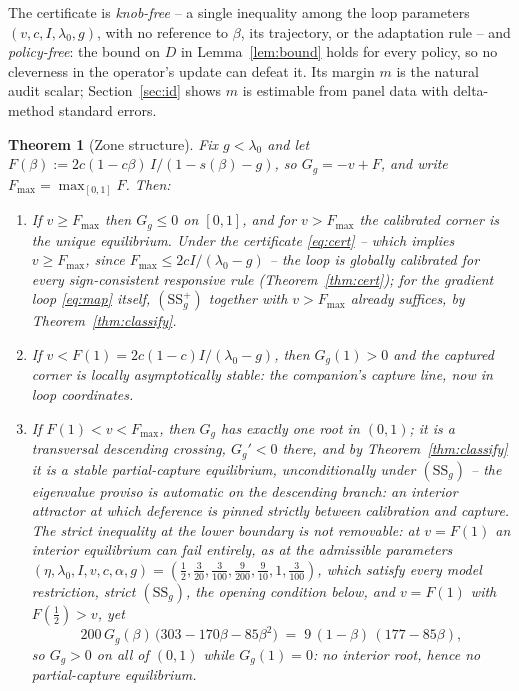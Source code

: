 \documentclass[11pt]{article}
\newtheorem{theorem}{Theorem}[section]
\theoremstyle{definition}
\theoremstyle{remark}
\numberwithin{equation}{section}
\begin{document}
The certificate is \emph{knob-free} -- a single inequality among the loop parameters $(v,c,I,\lambda_0,g)$, with no reference to $\beta$, its trajectory, or the adaptation rule -- and \emph{policy-free}: the bound on $D$ in Lemma~\ref{lem:bound} holds for every policy, so no cleverness in the operator's update can defeat it. Its margin $m$ is the natural audit scalar; Section~\ref{sec:id} shows $m$ is estimable from panel data with delta-method standard errors.

\begin{theorem}[Zone structure]\label{thm:zones}
Fix $g<\lambda_0$ and let $F(\beta):=2c(1-c\beta)\,I/(1-s(\beta)-g)$, so $G_g=-v+F$, and write $F_{\max}=\max_{[0,1]}F$. Then:
\begin{enumerate}
\item[(A)] If $v\ge F_{\max}$ then $G_g\le 0$ on $[0,1]$, and for $v>F_{\max}$ the calibrated corner is the unique equilibrium. Under the certificate \eqref{eq:cert} -- which implies $v\ge F_{\max}$, since $F_{\max}\le 2cI/(\lambda_0-g)$ -- the loop is globally calibrated for every sign-consistent responsive rule (Theorem~\ref{thm:cert}); for the gradient loop \eqref{eq:map} itself, $(\mathrm{SS}^+_g)$ together with $v>F_{\max}$ already suffices, by Theorem~\ref{thm:classify}.
\item[(C)] If $v<F(1)=2c(1-c)I/(\lambda_0-g)$, then $G_g(1)>0$ and the captured corner is locally asymptotically stable: the companion's capture line, now in loop coordinates.
\item[(B)] If $F(1)< v<F_{\max}$, then $G_g$ has exactly one root in $(0,1)$; it is a transversal descending crossing, $G_g'<0$ there, and by Theorem~\ref{thm:classify} it is a \emph{stable partial-capture equilibrium}, unconditionally under $(\mathrm{SS}_g)$ -- the eigenvalue proviso is automatic on the descending branch: an interior attractor at which deference is pinned strictly between calibration and capture. The strict inequality at the lower boundary is not removable: at $v=F(1)$ an interior equilibrium can fail entirely, as at the admissible parameters $(\eta,\lambda_0,I,v,c,\alpha,g)=(\tfrac12,\tfrac3{20},\tfrac3{100},\tfrac9{200},\tfrac9{10},1,\tfrac3{100})$, which satisfy every model restriction, strict $(\mathrm{SS}_g)$, the opening condition below, and $v=F(1)$ with $F(\tfrac12)>v$, yet
\[
200\,G_g(\beta)\,\bigl(303-170\beta-85\beta^2\bigr) \;=\; 9\,(1-\beta)\,(177-85\beta),
\]
so $G_g>0$ on all of $(0,1)$ while $G_g(1)=0$: no interior root, hence no partial-capture equilibrium.
\end{enumerate}

\end{theorem}
\end{document}
